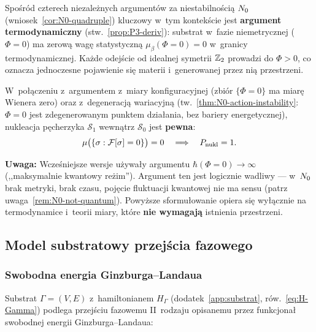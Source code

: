 \begin{remark}\label{rem:N0-unstable-G}
Spo\'sr\'od czterech niezale\.znych argument\'ow za niestabilno\'sci\k{a}
$N_0$ (wniosek~\ref{cor:N0-quadruple}) kluczowy w~tym
kontek\'scie jest \textbf{argument termodynamiczny}
(stw.~\ref{prop:P3-deriv}): substrat w~fazie niemetrycznej
($\Phi = 0$) ma zerow\k{a} wag\k{e} statystyczn\k{a}
$\mu_\beta(\Phi = 0) = 0$ w~granicy termodynamicznej.
Ka\.zde odej\'scie od idealnej symetrii $\mathbb{Z}_2$ prowadzi do
$\Phi > 0$, co oznacza jednoczesne pojawienie si\k{e}
materii i~generowanej przez ni\k{a} przestrzeni.

W~po\l{}\k{a}czeniu z~argumentem z~miary konfiguracyjnej
(zbi\'or $\{\Phi = 0\}$ ma miar\k{e} Wienera zero)
oraz z~degeneracj\k{a} wariacyjn\k{a}
(tw.~\ref{thm:N0-action-instability}: $\Phi = 0$
jest zdegenerowanym punktem dzia\l{}ania, bez bariery
energetycznej), nukleacja p\k{e}cherzyka $\mathcal{S}_1$
wewn\k{a}trz $\mathcal{S}_0$ jest \textbf{pewna}:
\begin{equation}\label{eq:nucleation-certainty}
    \mu\bigl(\{\sigma : \mathcal{F}[\sigma] = 0\}\bigr) = 0
    \quad\Longrightarrow\quad
    P_{\mathrm{nukl}} = 1.
\end{equation}

\textbf{Uwaga:} Wcze\'sniejsze wersje u\.zywa\l{}y argumentu
$\hbar(\Phi\!=\!0) \to \infty$ (,,maksymalnie kwantowy
re\.zim''). Argument ten jest logicznie wadliwy --- w~$N_0$
brak metryki, brak czasu, poj\k{e}cie fluktuacji kwantowej
nie ma sensu (patrz uwaga~\ref{rem:N0-not-quantum}).
Powy\.zsze sformu\l{}owanie opiera si\k{e} wy\l{}\k{a}cznie
na termodynamice i~teorii miary, kt\'ore \textbf{nie wymagaj\k{a}}
istnienia przestrzeni.
\end{remark}

\subsection{Model substratowy przej\'scia fazowego}%
\label{app:G-model}

\subsubsection{Swobodna energia Ginzburga--Landaua}

Substrat $\Gamma = (V,E)$ z~hamiltonianem $H_\Gamma$
(dodatek~\ref{app:substrat}, r\'ow.~\eqref{eq:H-Gamma})
podlega przej\'sciu fazowemu II~rodzaju opisanemu przez
funkcjona\l{} swobodnej energii Ginzburga--Landaua:

